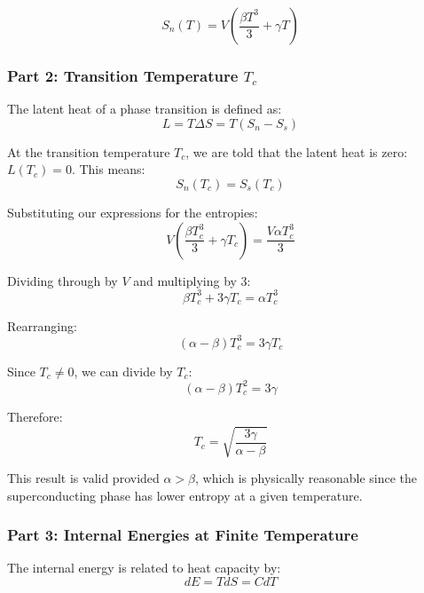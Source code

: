 \documentclass[10pt,twocoloumn]{article}
\begin{document}
\begin{equation}\boxed{S_n(T) = V\left(\frac{\beta T^3}{3} + \gamma T\right)}\end{equation}

\subsubsection*{Part 2: Transition Temperature $T_c$}

The latent heat of a phase transition is defined as:
\begin{equation}L = T\Delta S = T(S_n - S_s)\end{equation}

At the transition temperature $T_c$, we are told that the latent heat is zero: $L(T_c) = 0$. This means:
\begin{equation}S_n(T_c) = S_s(T_c)\end{equation}

Substituting our expressions for the entropies:
\begin{equation}V\left(\frac{\beta T_c^3}{3} + \gamma T_c\right) = \frac{V\alpha T_c^3}{3}\end{equation}

Dividing through by $V$ and multiplying by 3:
\begin{equation}\beta T_c^3 + 3\gamma T_c = \alpha T_c^3\end{equation}

Rearranging:
\begin{equation}(\alpha - \beta)T_c^3 = 3\gamma T_c\end{equation}

Since $T_c \neq 0$, we can divide by $T_c$:
\begin{equation}(\alpha - \beta)T_c^2 = 3\gamma\end{equation}

Therefore:
\begin{equation}\boxed{T_c = \sqrt{\frac{3\gamma}{\alpha - \beta}}}\end{equation}

This result is valid provided $\alpha > \beta$, which is physically reasonable since the superconducting phase has lower entropy at a given temperature.

\subsubsection*{Part 3: Internal Energies at Finite Temperature}

The internal energy is related to heat capacity by:
\begin{equation}dE = TdS = CdT\end{equation}
\end{document}
